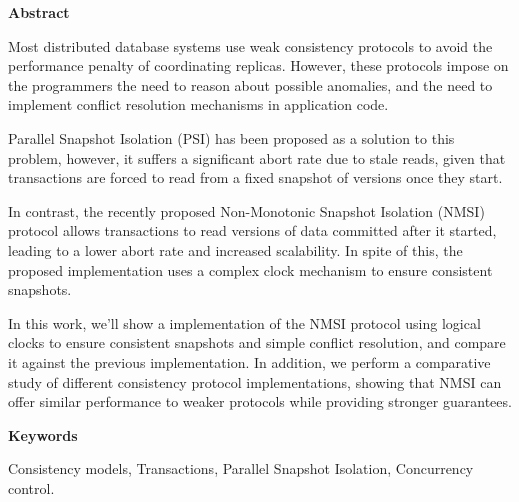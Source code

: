 \newpage

\begin{center}
{\bf \Huge Abstract}
\end{center}

\vspace{1cm}


Most distributed database systems use weak consistency protocols to avoid the
performance penalty of coordinating replicas. However, these protocols impose
on the programmers the need to reason about possible anomalies, and the need
to implement conflict resolution mechanisms in application code.

Parallel Snapshot Isolation (PSI) has been proposed as a solution to this
problem, however, it suffers a significant abort rate due to stale reads,
given that transactions are forced to read from a fixed snapshot of versions
once they start.

In contrast, the recently proposed Non-Monotonic Snapshot Isolation (NMSI)
protocol allows transactions to read versions of data committed after it
started, leading to a lower abort rate and increased scalability. In spite
of this, the proposed implementation uses a complex clock mechanism to ensure
consistent snapshots.

In this work, we'll show a implementation of the NMSI protocol using logical
clocks to ensure consistent snapshots and simple conflict resolution, and
compare it against the previous implementation. In addition, we perform a
comparative study of different consistency protocol implementations, showing
that NMSI can offer similar performance to weaker protocols while providing
stronger guarantees.

\vspace{1cm}

\begin{center}
{\bf \Large Keywords}
\end{center}

\vspace{0.5cm}

Consistency models, Transactions, Parallel Snapshot Isolation, Concurrency control.
